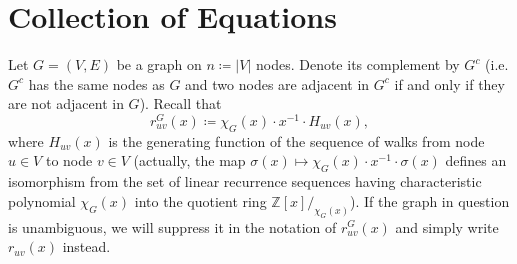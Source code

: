 \documentclass[a4paper,12pt]{article}
\begin{document}
\section*{Collection of Equations}

Let $G = (V,E)$ be a graph on $n \coloneqq |V|$ nodes. Denote its complement by $G^c$ (i.e. $G^c$ has the same nodes as $G$ and two nodes are adjacent in $G^c$ if and only if they are not adjacent in $G$). Recall that
$$
r^G_{uv}(x) \coloneqq \chi_G(x) \cdot x^{-1} \cdot H_{uv}(x),
$$
where $H_{uv}(x)$ is the generating function of the sequence of walks from node $u \in V$ to node $v \in V$ (actually, the map $\sigma(x) \mapsto \chi_G(x) \cdot x^{-1} \cdot \sigma(x)$ defines an isomorphism from the set of linear recurrence sequences having characteristic polynomial $\chi_G(x)$ into the quotient ring $\mathbb{Z}[x]/_{\chi_G(x)}$). If the graph in question is unambiguous, we will suppress it in the notation of $r^G_{uv}(x)$ and simply write $r_{uv}(x)$ instead.
\end{document}
